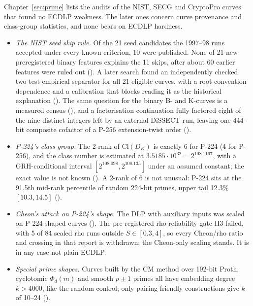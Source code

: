 Chapter~\ref{sec:prime} lists the audits of the NIST, SECG and CryptoPro
curves that found no ECDLP weakness. The later ones concern curve
provenance and class-group statistics, and none bears on ECDLP hardness.
\begin{itemize}
\item \emph{The NIST seed skip rule.} Of the 21 seed candidates the 1997--98
  runs accepted under every known criterion, 10 were published. None of 21
  new preregistered binary features explains the 11 skips, after about 60
  earlier features were ruled out
  (). A later search found an
  independently checked two-test empirical separator for all 21 eligible
  curves, with a root-convention dependence and a calibration that blocks
  reading it as the historical explanation
  (). The same question for the
  binary B- and K-curves is a measured census
  (), and a factorisation
  continuation fully factored eight of the nine distinct integers left by
  an external DiSSECT run, leaving one 444-bit composite cofactor of a
  P-256 extension-twist order ().
\item \emph{P-224's class group.} The 2-rank of $\mathrm{Cl}(D_K)$ is
  exactly 6 for P-224 (4 for P-256), and the class number is estimated at
  $3.5185\cdot10^{32}=2^{108.1167}$, with a GRH-conditional interval
  $[2^{108.098},2^{108.135}]$ under an assumed constant; the exact value is
  not known (). A 2-rank of 6 is
  not unusual: P-224 sits at the 91.5th mid-rank percentile of random
  224-bit primes, upper tail 12.3\% $[10.3,14.5]$
  ().
\item \emph{Cheon's attack on P-224's shape.} The DLP with auxiliary inputs
  was scaled on P-224-shaped curves
  (). The pre-registered
  rho-reliability gate H3 failed, with 5 of 84 sealed rho runs outside
  $S\in[0.3,4]$, so every Cheon/rho ratio and crossing in that report is
  withdrawn; the Cheon-only scaling stands. It is in any case not plain
  ECDLP.
\item \emph{Special prime shapes.} Curves built by the CM method over
  192-bit Proth, cyclotomic $\Phi_d(m)$ and smooth $p\pm1$ primes all have
  embedding degree $k>4000$, like the random control; only pairing-friendly
  constructions give $k$ of 10--24 ().

\end{itemize}
